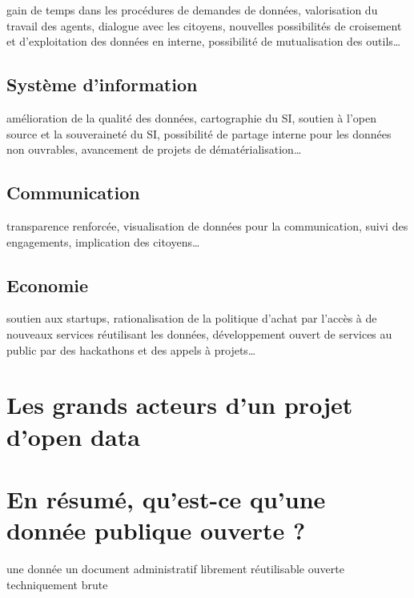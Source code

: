 \documentclass[]{book}
\theoremstyle{definition}
\theoremstyle{definition}
\theoremstyle{definition}
\theoremstyle{remark}
\begin{document}
gain de temps dans les procédures de demandes de données, valorisation
du travail des agents, dialogue avec les citoyens, nouvelles
possibilités de croisement et d'exploitation des données en interne,
possibilité de mutualisation des outils\ldots{}

\subsection{Système d'information}\label{systeme-dinformation}

amélioration de la qualité des données, cartographie du SI, soutien à
l'open source et la souveraineté du SI, possibilité de partage interne
pour les données non ouvrables, avancement de projets de
dématérialisation\ldots{}

\subsection{Communication}\label{communication}

transparence renforcée, visualisation de données pour la communication,
suivi des engagements, implication des citoyens\ldots{}

\subsection{Economie}\label{economie}

soutien aux startups, rationalisation de la politique d'achat par
l'accès à de nouveaux services réutilisant les données, développement
ouvert de services au public par des hackathons et des appels à
projets\ldots{}

\section{Les grands acteurs d'un projet d'open
data}\label{les-grands-acteurs-dun-projet-dopen-data}

\section{En résumé, qu'est-ce qu'une donnée publique ouverte
?}\label{en-resume-quest-ce-quune-donnee-publique-ouverte}

une donnée un document administratif librement réutilisable ouverte
techniquement brute
\end{document}
